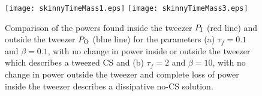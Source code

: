 \begin{figure}[htb!]
\centering
\texttt{[image: skinnyTimeMass1.eps]} 
\texttt{[image: skinnyTimeMass3.eps]} 
\caption[Tweezer with Narrow Width Power Comparison]{Comparison of the powers found inside the tweezer $P_{\rm I}$ (red line) and outside the tweezer $P_{\rm O}$ (blue line) for the parameters (a) $\tau_f = 0.1$ and $\beta=0.1$, with no change in power inside or outside the tweezer which describes a tweezed CS and (b) $\tau_f = 2$ and $\beta = 10$, with no change in power outside the tweezer and complete loss of power inside the tweezer describes a dissipative no-CS solution.  
}
\label{fig:SkinnyComp}
\end{figure}


